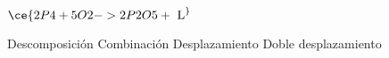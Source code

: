 $\ce{2P4 + 5O2 ->2P2O5 + \text{ L} ^}$

\begin{choices}
    \choice Descomposición
    \CorrectChoice Combinación
    \choice Desplazamiento
    \choice Doble desplazamiento
\end{choices}